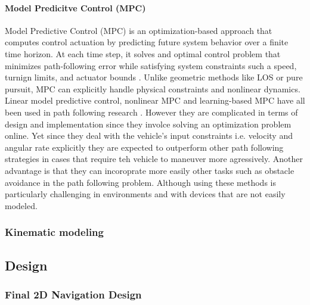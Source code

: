 \paragraph*{Model Predicitve Control (MPC)}
Model Predictive Control (MPC) is an optimization-based approach that computes control actuation by predicting future system behavior over a finite time horizon. At each time step, it solves and optimal control problem that minimizes path-following error while satisfying system constraints such a speed, turnign limits, and actuator bounds \cite{hung_review_2023}. 
\newline \newline
Unlike geometric methods like LOS or pure pursuit, MPC can explicitly handle physical constraints and nonlinear dynamics. Linear model predictive control, nonlinear MPC and learning-based MPC have all been used in path following research \cite{hung_review_2023}. However they are complicated in terms of design and implementation since they involce solving an optimization problem online. Yet since they deal with the vehicle's input constraints i.e. velocity and angular rate explicitly they are  expected to outperform other path following strategies in cases that require teh vehicle to maneuver more agressively. Another advantage is that they can incoroprate more easily other tasks such as obstacle avoidance in the path following problem. Although using these methods is particularly challenging in environments and with devices that are not easily modeled.

\subsubsection{Kinematic modeling}

\subsection{Design}
\subsubsection{Final 2D Navigation Design}


